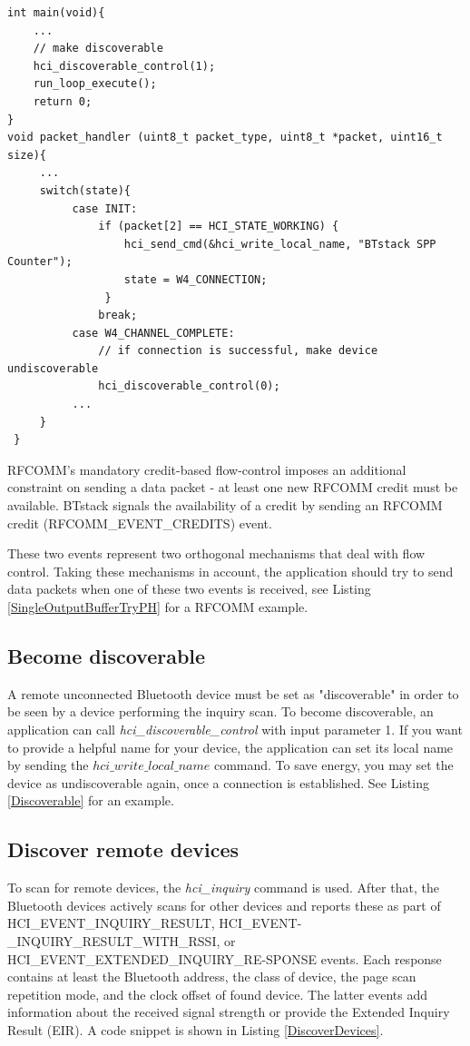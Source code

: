 \documentclass[a4paper,titlepage,oneside,12pt]{amsart} %
\begin{document}
\begin{lstlisting}[caption=Setting device as discoverable. OFF by default., label=Discoverable]
int main(void){
    ... 
    // make discoverable
    hci_discoverable_control(1);
    run_loop_execute(); 
    return 0;
}
void packet_handler (uint8_t packet_type, uint8_t *packet, uint16_t size){
     ...
     switch(state){
          case INIT:
              if (packet[2] == HCI_STATE_WORKING) {
                  hci_send_cmd(&hci_write_local_name, "BTstack SPP Counter");
                  state = W4_CONNECTION;
               }
              break;
          case W4_CHANNEL_COMPLETE:
              // if connection is successful, make device undiscoverable
              hci_discoverable_control(0);
          ...
     }
 }
\end{lstlisting}


RFCOMM's mandatory credit-based flow-control imposes an additional constraint on sending a data packet - at least one new RFCOMM credit must be available. BTstack signals the availability of a credit by sending an RFCOMM credit (RFCOMM\_EVENT\_CREDITS) event. 

These two events represent two orthogonal mechanisms that deal with flow control. Taking these mechanisms in account, the application should try to send data packets when one of these two events is received, see Listing \ref{SingleOutputBufferTryPH} for a RFCOMM example.

\subsection{Become discoverable}
A remote unconnected Bluetooth device must be set as "discoverable" in order to be seen by a device performing the inquiry scan. To become discoverable, an application can call \emph{hci\_discoverable\_control}  with input parameter 1. If you want to provide a helpful name for your device, the application can set its local name by sending the $hci\_write\_local\_name$ command. To save energy, you may set the device as undiscoverable again, once a connection is established. See Listing \ref{Discoverable} for an example.


\subsection{Discover remote devices}
\label{section:DiscoverDevices}
To scan for remote devices, the \emph{hci\_inquiry} command is used. After that, the Bluetooth devices actively scans for other devices and reports these as part of HCI\_EVENT\_INQUIRY\_RESULT, HCI\_EVENT-\_INQUIRY\_RESULT\_WITH\_RSSI, or HCI\_EVENT\_EXTENDED\_INQUIRY\_RE-SPONSE events. Each response contains at least the Bluetooth address, the class of device, the page scan repetition mode, and the clock offset of found device. The latter events add information about the received signal strength or provide the Extended Inquiry Result (EIR). A code snippet is shown in Listing \ref{DiscoverDevices}.
\end{document}
